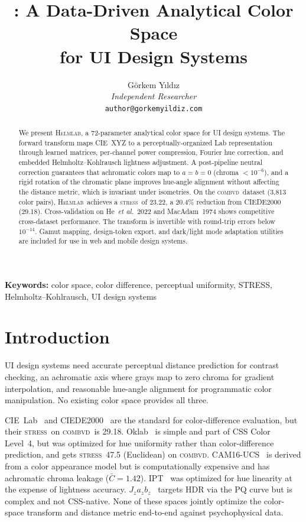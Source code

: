 \documentclass[11pt, twocolumn]{article}
\title{\helmlab: A Data-Driven Analytical Color Space\\for UI Design Systems}
\author{
  G\"orkem Y{\i}ld{\i}z\\
  \textit{Independent Researcher}\\
  \texttt{author@gorkemyildiz.com}
}
\date{}
\newcommand{\helmlab}{\textsc{Helmlab}}
\newcommand{\stress}{\textsc{stress}}
\newcommand{\combvd}{\textsc{combvd}}
\newcommand{\etal}{\textit{et al.}}
\begin{document}
\maketitle

\begin{abstract}
We present \helmlab, a 72-parameter analytical color space for
UI design systems. The forward transform maps CIE~XYZ to a
perceptually-organized Lab representation through learned matrices,
per-channel power compression, Fourier hue correction, and embedded
Helmholtz--Kohlrausch lightness adjustment. A post-pipeline neutral
correction guarantees that achromatic colors map to
$a\!=\!b\!=\!0$ (chroma $<10^{-6}$), and a rigid rotation of the
chromatic plane improves hue-angle alignment without affecting the
distance metric, which is invariant under isometries. On the
\combvd\ dataset (3{,}813 color pairs), \helmlab\ achieves a
\stress\ of 23.22, a 20.4\% reduction from CIEDE2000 (29.18).
Cross-validation on He~\etal\ 2022 and MacAdam~1974 shows
competitive cross-dataset performance. The transform is
invertible with round-trip errors below $10^{-14}$.
Gamut mapping, design-token export, and dark/light mode
adaptation utilities are included for use in web and mobile
design systems.
\end{abstract}

\textbf{Keywords:} color space, color difference, perceptual uniformity, STRESS, Helmholtz--Kohlrausch, UI design systems


\section{Introduction}
\label{sec:intro}

UI design systems need accurate perceptual distance prediction for
contrast checking, an achromatic axis where grays map to zero chroma
for gradient interpolation, and reasonable hue-angle alignment for
programmatic color manipulation. No existing color space provides all
three.

CIE~Lab~\cite{cie1976} and CIEDE2000~\cite{luo2001} are the
standard for color-difference evaluation, but their
\stress\ on \combvd\ is 29.18.
Oklab~\cite{ottosson2020} is simple and part of CSS Color Level~4,
but was optimized for hue uniformity rather than color-difference
prediction, and gets \stress\ 47.5 (Euclidean) on \combvd.
CAM16-UCS~\cite{li2017} is derived from a color appearance model
but is computationally expensive and has achromatic chroma leakage
($\bar{C}=1.42$). IPT~\cite{ebner1998} was optimized for hue
linearity at the expense of lightness accuracy.
$J_z a_z b_z$~\cite{safdar2017} targets HDR via the PQ curve but
is complex and not CSS-native. None of these spaces jointly
optimize the color-space transform and distance metric end-to-end
against psychophysical data.
\end{document}
